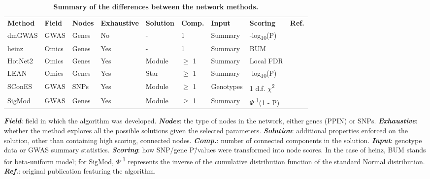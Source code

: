 \documentclass[10pt,letterpaper]{article}
\newlength\savedwidth
\newcommand\thickhline{\noalign{\global\savedwidth\arrayrulewidth\global\arrayrulewidth 2pt}%
\hline
\noalign{\global\arrayrulewidth\savedwidth}}
\begin{document}
\begin{table}[!ht]
  \begin{adjustwidth}{-2.25in}{0in} %
  \centering
  \caption{
  {\bf Summary of the differences between the network methods.}}
  \begin{tabular}{l|llllllll}
  {\bf Method} & {\bf Field } & {\bf Nodes} & {\bf Exhaustive} & {\bf Solution} & {\bf Comp.} & {\bf Input} & {\bf Scoring} & {\bf Ref.}\\ \thickhline
  dmGWAS & GWAS & Genes & No & - & 1 & Summary & -log\textsubscript{10}(P) & \cite{jia_dmgwas:_2011}\\
  heinz & Omics & Genes & Yes & - & 1 & Summary & BUM & \cite{dittrich_identifying_2008}\\
  HotNet2 & Omics & Genes & Yes & Module & \(\ge\) 1 & Summary & Local FDR & \cite{leiserson_pan-cancer_2015}\\
  LEAN & Omics & Genes & Yes & Star & \(\ge\) 1 & Summary & -log\textsubscript{10}(P) & \cite{gwinner_network-based_2016}\\
  SConES & GWAS & SNPs & Yes & Module & \(\ge\) 1 & Genotypes & 1 d.f. \(\chi\)\textsuperscript{2} & \cite{azencott_efficient_2013}\\
  SigMod & GWAS & Genes & Yes & Module & \(\ge\) 1 & Summary & $\Phi$\textsuperscript{-1}(1 - P) & \cite{liu_sigmod:_2017}\\
  \end{tabular}
  \begin{flushleft} \textbf{\emph{Field}}: field in which the algorithm was developed. \textbf{\emph{Nodes}}: the type of nodes in the network, either genes (PPIN) or SNPs. \textbf{\emph{Exhaustive}}: whether the method explores all the possible solutions given the selected parameters. \textbf{\emph{Solution}}: additional properties enforced on the solution, other than containing high scoring, connected nodes. \textbf{\emph{Comp.}}: number of connected components in the solution. \textbf{\emph{Input}}: genotype data or GWAS summary statistics. \textbf{\emph{Scoring}}: how SNP/gene P\=/values were transformed into node scores. In the case of heinz, BUM stands for beta-uniform model; for SigMod, $\Phi$\textsuperscript{-1} represents the inverse of the cumulative distribution function of the standard Normal distribution. \textbf{\emph{Ref.}}: original publication featuring the algorithm.
  \end{flushleft}
  \label{tab:method_comparison}
  \end{adjustwidth}
\end{table}
\end{document}

